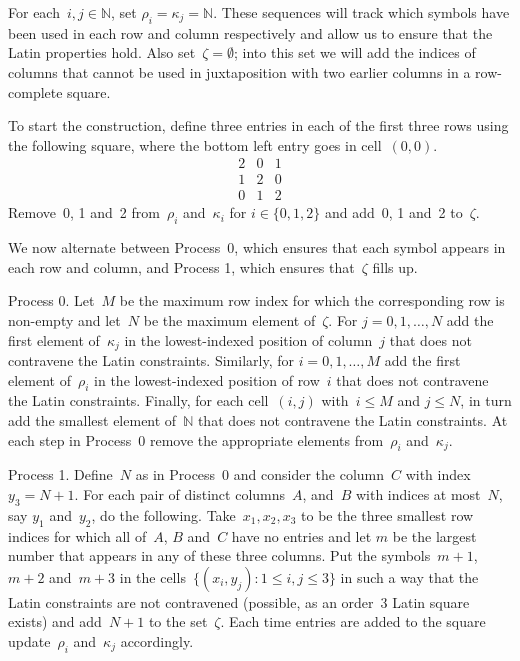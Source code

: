 \documentclass[12pt,a4paper]{article}
\newcommand{\N}{\mathbb{N}}
\begin{document}
For each~$i,j \in \N$, set $\rho_i = \kappa_j = \N$.  These sequences will track which symbols have been used in each row and column respectively and allow us to ensure that the Latin properties hold.  Also set~$\zeta = \emptyset$; into this set we will add the indices of columns that cannot be used in juxtaposition with two earlier columns in a row-complete square.

To start the construction, define three entries in each of the first three rows using the following square, where the bottom left entry goes in cell~$(0,0)$.
$$
\begin{array}{ccc}
2  & 0   &  1 \\ 
1 & 2 &  0  \\
 0  & 1 & 2 
\end{array}
$$
Remove~0, 1 and~2 from~$\rho_i$ and~$\kappa_i$ for $i \in \{0,1,2\}$ and add~0, 1 and~2 to~$\zeta$.

We now alternate between Process~0, which ensures that each symbol appears in each row and column, and Process 1, which ensures that~$\zeta$ fills up.

Process 0.  Let~$M$ be the maximum row index for which the corresponding row is non-empty and let~$N$ be the maximum element of~$\zeta$.  For $j = 0,1,\ldots, N$ add the first element of~$\kappa_j$ in the lowest-indexed position of column~$j$ that does not contravene the Latin constraints.  Similarly, for $i = 0,1,\ldots, M$ add the first element of~$\rho_i$ in the lowest-indexed position of row~$i$ that does not contravene the Latin constraints.  Finally, for each cell~$(i,j)$ with~$i \leq M$ and $j \leq N$, in turn add the smallest element of~$\N$ that does not contravene the Latin constraints.    At each step in Process~0 remove the appropriate elements from~$\rho_i$ and~$\kappa_j$.

Process 1.  Define~$N$ as in Process~0 and consider the column~$C$ with index~$y_3 = N+1$.  For each pair of distinct columns~$A$, and~$B$ with indices at most~$N$, say $y_1$ and~$y_2$, do the following.  Take~$x_1, x_2, x_3$ to be the three smallest row indices for which all of~$A$, $B$ and~$C$ have no entries and let $m$ be the largest number that appears in any of these three columns.  Put the symbols~$m+1$, $m+2$ and~$m+3$ in the cells~$\{ (x_i, y_j) : 1 \leq i,j \leq 3 \}$ in such a way that the Latin constraints are not contravened (possible, as an order~3 Latin square exists) and add~$N+1$ to the set~$\zeta$.  Each time entries are added to the square update~$\rho_i$ and~$\kappa_j$ accordingly.
\end{document}
